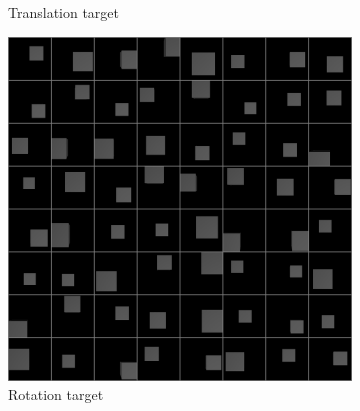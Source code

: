 \documentclass[10pt,a4paper]{article}
\begin{document}
\begin{figure}[!ht]
\begin{subfigure}{0.49\textwidth}
	\caption{Translation target}
	\label{cube_tt}
\end{subfigure}
\begin{subfigure}{0.49\textwidth}
	\centering	
	\includegraphics[width=\textwidth]{cube_target1.png}
	\caption{Rotation target}
	\label{cube_rt}
\end{subfigure}
\caption{} \label{cube_images}
\end{figure}
\end{document}
